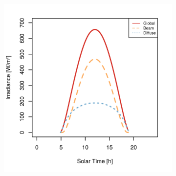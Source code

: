 \begin{figure}[h]
\captionsetup[subfigure]{justification=centering}
\centering
    \setlength{\subfigureWidth}{0.50\textwidth}
    \setlength{\graphicsHeight}{80mm}
    \hypersetup{hidelinks=true}%
    \begin{subfigure}[t]{\subfigureWidth}
        \centering
            \includegraphics[height=\graphicsHeight]{sections/mars-solar-energy/solar-radiation/plots/gh-gbh-gdh-variation-1-for-ls-248-phi-34-tau-04-and-albedo-027.png}
            \label{fig:plot:sub:irradiance-phi-m34}
    \end{subfigure}\hfill
    \begin{subfigure}[t]{\subfigureWidth}
        \centering

\end{subfigure}
\end{figure}
